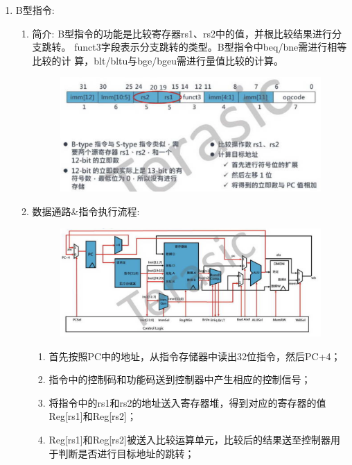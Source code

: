 \documentclass[a4paper, 14pt, oneside]{book} %
\numberwithin{equation}{subsection}
\begin{document}
\begin{enumerate}
\begin{enumerate}
					\end{enumerate}
				\item{B型指令:}
					\begin{enumerate}
						\item{简介:}
							\subitem
								B型指令的功能是比较寄存器rs1、rs2中的值，并根比较结果进行分支跳转。
								funct3字段表示分支跳转的类型。B型指令中beq/bne需进行相等比较的计
								算，blt/bltu与bge/bgeu需进行量值比较的计算。
								\begin{figure}[!htbp]
									\centering
									\includegraphics[scale=0.5]{img/b1.png}
								\end{figure}
						\item{数据通路\&指令执行流程:}
							\begin{figure}[!htbp]
								\centering
								\includegraphics[scale=0.5]{img/b2.png}
							\end{figure}
							\begin{enumerate}
								\item
									首先按照PC中的地址，从指令存储器中读出32位指令，然后PC+4；
								\item
									指令中的控制码和功能码送到控制器中产生相应的控制信号；
								\item
									将指令中的rs1和rs2的地址送入寄存器堆，得到对应的寄存器的值Reg[rs1]和Reg[rs2]；
								\item
									Reg[rs1]和Reg[rs2]被送入比较运算单元，比较后的结果送至控制器用于判断是否进行目标地址的跳转；

\end{enumerate}
\end{enumerate}
\end{enumerate}
\end{document}
